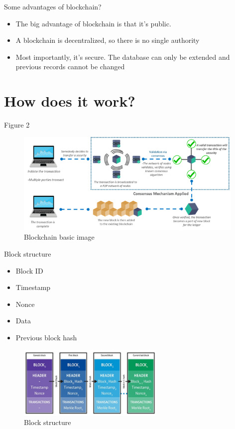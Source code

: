 \documentclass[10pt]{beamer}
\begin{document}
{
\begin{frame}{Some advantages of blockchain?}
\begin{itemize}

\item The big advantage of blockchain is that it's
public.
\item A blockchain is decentralized, so there is no
single authority
\item Most importantly, it's secure. The database
can only be extended and previous records
cannot be changed

\end{itemize}
\end{frame}
}

\section{How does it work?}

\begin{frame}[fragile]{Figure 2}
  \begin{figure}  
	\includegraphics[width=11cm]{main-chain}    
    \caption{Blockchain basic image}  %
\end{figure}
\end{frame}

\begin{frame}{Block structure}

  \begin{itemize}
    \item Block ID
    \item Timestamp
    \item Nonce
    \item Data
    \item Previous block hash
   \end{itemize}
     \begin{figure}  
	\includegraphics[width=7cm]{blockchain-diagrams-02}    
    \caption{Block structure}  %
\end{figure}
\end{frame}
\end{document}
